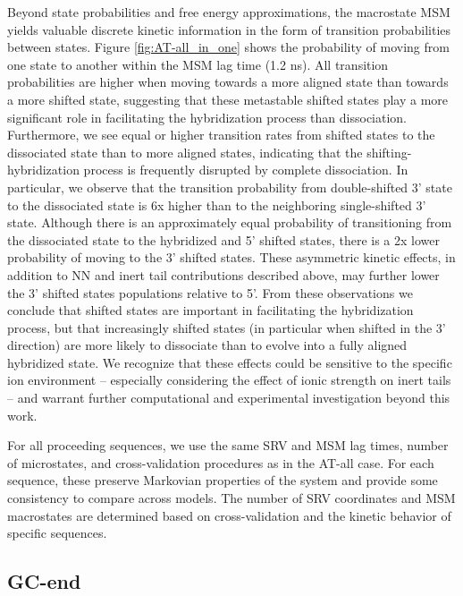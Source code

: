 \documentclass[journal=jpcbfk,manuscript=article]{achemso}
\begin{document}
Beyond state probabilities and free energy approximations, the macrostate MSM yields valuable discrete kinetic information in the form of transition probabilities between states. Figure \ref{fig:AT-all_in_one} shows the probability of moving from one state to another within the MSM lag time (1.2 ns). All transition probabilities are higher when moving towards a more aligned state than towards a more shifted state, suggesting that these metastable shifted states play a more significant role in facilitating the hybridization process than dissociation. Furthermore, we see equal or higher transition rates from shifted states to the dissociated state than to more aligned states, indicating that the shifting-hybridization process is frequently disrupted by complete dissociation. In particular, we observe that the transition probability from double-shifted 3' state to the dissociated state is 6x higher than to the neighboring single-shifted 3' state. Although there is an approximately equal probability of transitioning from the dissociated state to the hybridized and 5' shifted states, there is a 2x lower probability of moving to the 3' shifted states. These asymmetric kinetic effects, in addition to NN and inert tail contributions described above, may further lower the 3' shifted states populations relative to 5'. From these observations we conclude that shifted states are important in facilitating the hybridization process, but that increasingly shifted states (in particular when shifted in the 3' direction) are more likely to dissociate than to evolve into a fully aligned hybridized state. We recognize that these effects could be sensitive to the specific ion environment -- especially considering the effect of ionic strength on inert tails -- and warrant further computational and experimental investigation beyond this work.

For all proceeding sequences, we use the same SRV and MSM lag times, number of microstates, and cross-validation procedures as in the AT-all case. For each sequence, these preserve Markovian properties of the system and provide some consistency to compare across models. The number of SRV coordinates and MSM macrostates are determined based on cross-validation and the kinetic behavior of specific sequences.


\subsection{GC-end}
\end{document}

